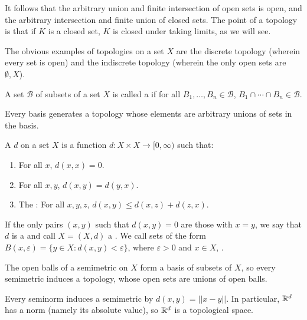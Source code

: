 \begin{subsec}
It follows that the arbitrary union and finite intersection of open sets is open, and the arbitrary intersection and finite union of closed sets.
The point of a topology is that if $K$ is a closed set, $K$ is closed under taking limits, as we will see.
\end{subsec}

\begin{subsec}
The obvious examples of topologies on a set $X$ are the discrete topology (wherein every set is open) and the indiscrete topology (wherein the only open sets are $\emptyset, X$).
\end{subsec}

\begin{definition}
A set $\mathcal B$ of subsets of a set $X$ is called a  if for all $B_1, \dots, B_n \in \mathcal B$, $B_1 \cap \cdots \cap B_n \in \mathcal B$.
\end{definition}

\begin{subsec}
Every basis generates a topology whose elements are arbitrary unions of sets in the basis.
\end{subsec}

\begin{definition}
A  $d$ on a set $X$ is a function $d: X \times X \to [0, \infty)$ such that:
\begin{enumerate}
\item For all $x$, $d(x, x) = 0$.
\item For all $x,y$, $d(x, y) = d(y, x)$.
\item The : For all $x,y,z$, $d(x, y) \leq d(x, z) + d(z, x)$.
\end{enumerate}
If the only pairs $(x, y)$ such that $d(x, y) = 0$ are those with $x=y$, we say that $d$ is a  and call $X = (X,d)$ a .
We call sets of the form $B(x, \varepsilon) = \{y \in X: d(x, y) < \varepsilon\}$, where $\varepsilon > 0$ and $x \in X$, .
\end{definition}

\begin{subsec}
The open balls of a semimetric on $X$ form a basis of subsets of $X$, so every semimetric induces a topology, whose open sets are unions of open balls.
\end{subsec}

\begin{example}
Every seminorm induces a semimetric by $d(x, y) = ||x - y||$.
In particular, $\mathbb{R}^d$ has a norm (namely its absolute value), so $\mathbb{R}^d$ is a topological space.
\end{example}

